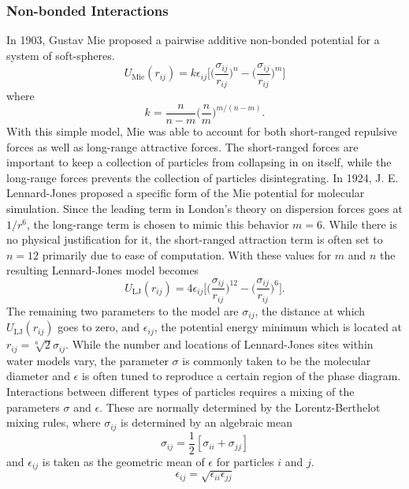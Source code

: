 \subsubsection{Non-bonded Interactions}
In 1903, Gustav Mie proposed a pairwise additive
non-bonded potential for a system of soft-spheres.
\begin{equation}\label{eq:LJ}
U_{\mathrm{Mie}}(r_{ij}) = k\epsilon_{ij}\Bigg[ \Big( \frac{\sigma_{ij}}{r_{ij}}\Big)^n - \Big(\frac{\sigma_{ij}}{r_{ij}}\Big)^m\Bigg]
\end{equation}
where
\begin{equation}\label{eq:LJ2}
k = \frac{n}{n-m} \Big(\frac{n}{m}\Big)^{m/(n-m)}.
\end{equation}
With this simple model, Mie was able to account for both short-ranged
repulsive forces as well as long-range attractive forces. The
short-ranged forces are important to keep a collection of particles
from collapsing in on itself, while the long-range forces prevents the
collection of particles disintegrating. In 1924, J. E. Lennard-Jones
proposed a specific form of the Mie potential for molecular
simulation. Since the leading term in London's theory on dispersion
forces goes at $1/r^6$, the long-range term is chosen to mimic this
behavior $m=6$. While there is no physical justification for it, the
short-ranged attraction term is often set to $n=12$ primarily due to
ease of computation. With these values for $m$ and $n$ the resulting
Lennard-Jones model becomes
\begin{equation}\label{eq:LJ3}
U_{\mathrm{LJ}}(r_{ij}) =
4\epsilon_{ij}\Bigg[\Big(\frac{\sigma_{ij}}{r_{ij}}\Big)^{12}-\Big(\frac{\sigma_{ij}}{r_{ij}}\Big)^{6}\Bigg].
\end{equation} 
The remaining two parameters to the model are $\sigma_{ij}$, the distance
at which $U_{\mathrm{LJ}}(r_{ij})$ goes to zero, and $\epsilon_{ij}$, the potential
energy minimum which is located at $r_{ij} = \sqrt[6]{2}\sigma_{ij}$. While the
number and locations of Lennard-Jones sites within water models vary,
the parameter $\sigma$ is commonly taken to be the molecular diameter
and $\epsilon$ is often tuned to reproduce a certain region of the
phase diagram. Interactions between different types of particles
requires a mixing of the parameters $\sigma$ and $\epsilon$. These are
normally determined by the Lorentz-Berthelot mixing rules, where
$\sigma_{ij}$ is determined by an algebraic mean 
\begin{equation}\label{eq:sigma}
\sigma_{ij} = \frac{1}{2} [\sigma_{ii} + \sigma_{jj}]
\end{equation}
and $\epsilon_{ij}$ is taken as the geometric mean of $\epsilon$ for
particles $i$ and $j$. \cite{Lorentz1881,Berthelot1898}
\begin{equation}\label{eq:epsilon}
\epsilon_{ij} = \sqrt{\epsilon_{ii}\epsilon_{jj}}
\end{equation}


